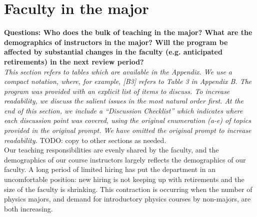 \documentclass[12pt]{article}
\begin{document}
\newpage
\section{Faculty in the major}
\label{sec:faculty}

{\bf Questions: Who does the bulk of teaching in the major? What are
  the demographics of instructors in the major? Will the program be
  affected by substantial changes in the faculty (e.g. anticipated
  retirements) in the next review period?}\\[3pt]


\noindent
{\it This section refers to tables which are available in the
  Appendix.  We use a compact notation, where, for example, [B3]
  refers to Table 3 in Appendix B.  The program was provided with an
  explicit list of items to discuss.  To increase readability, we
  discuss the salient issues in the most natural order first.  At the
  end of this section, we include a ``Discussion Checklist'' which
  indicates where each discussion point was covered, using the
  original enumeration (a-e) of topics provided in the original
  prompt. We have omitted the original prompt to increase
  readability.}  {\color{red} TODO: copy to other sections as
  needed}.\\[3pt]

\noindent
Our teaching responsibilities are evenly shared by the faculty, and
the demographics of our course instructors largely reflects the
demographics of our faculty.  A long period of limited hiring has put
the department in an uncomfortable position: new hiring is not keeping
up with retirements and the size of the faculty is shrinking.  This
contraction is occurring when the number of physics majors, and demand
for introductory physics courses by non-majors, are both
increasing.\\[3pt]
\end{document}
